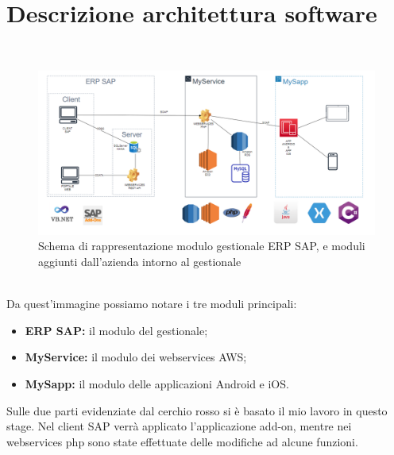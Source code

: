 
\chapter{Descrizione architettura software}
\label{cap:descrizione-architettura}

\\
\begin{figure}[!h] 
	\centering 
	\includegraphics[scale = 0.4]{immagini/architettura-globale.png} 
	\caption{Schema di rappresentazione modulo gestionale ERP SAP, e moduli aggiunti dall'azienda intorno al gestionale}
\end{figure}\\
Da quest'immagine possiamo notare i tre moduli principali:
\begin{itemize}
	\item \textbf{ERP SAP:} il modulo del gestionale;
	\item \textbf{MyService:} il modulo dei webservices AWS;
	\item \textbf{MySapp:} il modulo delle applicazioni Android e iOS.\\
\end{itemize}
Sulle due parti evidenziate dal cerchio rosso si è basato il mio lavoro in questo stage.
Nel client SAP verrà applicato l'applicazione add-on, mentre nei webservices php sono state effettuate delle modifiche ad alcune funzioni.
